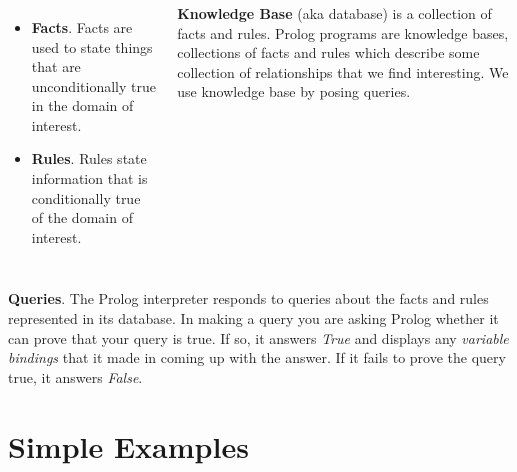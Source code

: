 \begin{frame}
	\frametitle{\insertsection}
	
	\begin{block}{}
		\begin{columns}	
			\column{60mm}
				\begin{itemize}
					\item \textbf{Facts}. Facts are used to state things that are unconditionally true in the domain of interest.
					\item \textbf{Rules}. Rules state information that is conditionally true of the domain of interest.
				\end{itemize}
			\column{70mm}
				\textbf{Knowledge Base} (aka database) is a collection of facts and rules. Prolog programs are knowledge
				bases, collections of facts and rules which describe some collection of relationships that we find interesting. We use knowledge base
				by posing queries.
		\end{columns}
	\end{block}

	\textbf{Queries}. The Prolog interpreter responds to queries about the facts and rules represented in its database. In making a query you are asking Prolog whether it can prove that your query is true. If so, it answers \textit{True} and displays any \textit{variable bindings} that it made in coming up with the answer. If it fails to prove the query true, it answers \textit{False}.
	
\end{frame}

\section{Simple Examples}


